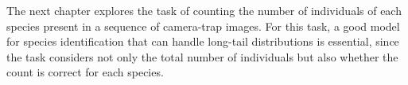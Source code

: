 The next chapter explores the task of counting the number of individuals of each 
species present in a sequence of camera-trap images. For this task, a good model 
for species identification that can handle long-tail distributions is essential, 
since the task considers not only the total number of individuals but also whether 
the count is correct for each species.
